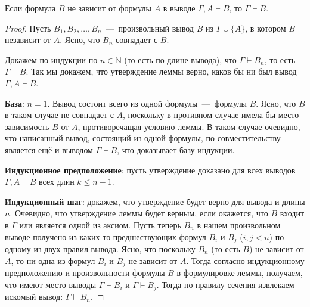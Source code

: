 \begin{lemma}\label{th:independent_formulas}
    Если формула $B$ не зависит от формулы $A$ в выводе $\Gamma, A \vdash B$, то $\Gamma \vdash B$.
\end{lemma}
\begin{proof}
    Пусть $B_1, B_2, \dots, B_n$~---~произвольный вывод $B$ из $\Gamma \cup \{A\}$, в котором $B$ независит от $A$. Ясно, что $B_n$ совпадает с $B$.

    Докажем по индукции по $n \in \mathbb{N}$ (то есть по длине вывода), что $\Gamma \vdash B_n$, то есть $\Gamma \vdash B$. Так мы докажем, что утверждение леммы верно, каков бы ни был вывод $\Gamma, A \vdash B$.

    \textbf{База}: $n = 1$. Вывод состоит всего из одной формулы~---~формулы $B$. Ясно, что $B$ в таком случае не совпадает с $A$, поскольку в противном случае имела бы место зависимость $B$ от $A$, противоречащая условию леммы. В таком случае очевидно, что написанный вывод, состоящий из одной формулы, по совместительству является ещё и выводом $\Gamma \vdash B$, что доказывает базу индукции.

    \textbf{Индукционное предположение}: пусть утверждение доказано для всех выводов $\Gamma, A \vdash B$ всех длин $k \leqslant n - 1$.

    \textbf{Индукционный шаг}: докажем, что утверждение будет верно для вывода и длины $n$. Очевидно, что утверждение леммы будет верным, если окажется, что $B$ входит в $\Gamma$ или является одной из аксиом. Пусть теперь $B_n$ в нашем произвольном выводе получено из каких-то предшествующих формул $B_i$ и $B_j$ ($i, j < n$) по одному из двух правил вывода. Ясно, что поскольку $B_n$ (то есть $B$) не зависит от $A$, то ни одна из формул $B_i$ и $B_j$ не зависит от $A$. Тогда согласно индукционному предположению и произвольности формулы $B$ в формулировке леммы, получаем, что имеют место выводы $\Gamma \vdash B_i$ и $\Gamma \vdash B_j$. Тогда по правилу сечения извлекаем искомый вывод: $\Gamma \vdash B_n$.
\end{proof}

